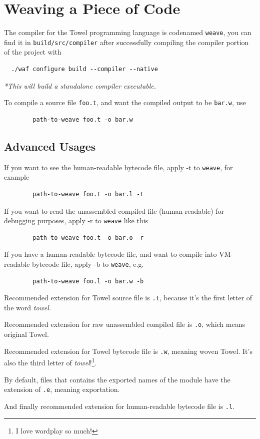 \documentclass{report}
\begin{document}
\section{Weaving a Piece of Code}

The compiler for the Towel programming language is codenamed \texttt{weave}, you can find it in \texttt{build/src/compiler} after successfully compiling the compiler portion of the project with
\begin{mdframed}[style=example]
\begin{verbatim}
  ./waf configure build --compiler --native
\end{verbatim}

\textit{*This will build a standalone compiler executable.}
\end{mdframed}

To compile a source file \texttt{foo.t}, and want the compiled output to be \texttt{bar.w}, use

\begin{verbatim}
        path-to-weave foo.t -o bar.w
\end{verbatim}

\subsection{Advanced Usages}

If you want to see the human-readable bytecode file, apply -t to \texttt{weave}, for example

\begin{verbatim}
        path-to-weave foo.t -o bar.l -t
\end{verbatim}

If you want to read the unassembled compiled file (human-readable) for debugging purposes, apply -r to \texttt{weave} like this

\begin{verbatim}
        path-to-weave foo.t -o bar.o -r
\end{verbatim}

If you have a human-readable bytecode file, and want to compile into VM-readable bytecode file, apply -b to \texttt{weave}, e.g.

\begin{verbatim}
        path-to-weave foo.l -o bar.w -b
\end{verbatim}

\begin{mdframed}[style=hint]
  Recommended extension for Towel source file is \texttt{.t}, because it's the first letter of the word \textit{towel}.

  Recommended extension for raw unassembled compiled file is \texttt{.o}, which means original Towel.

  Recommended extension for Towel bytecode file is \texttt{.w}, meaning woven Towel. It's also the third letter of \textit{towel}!\footnote{I love wordplay so much!}.

  By default, files that contains the exported names of the module have the extension of \texttt{.e}, meaning exportation.

  And finally recommended extension for human-readable bytecode file is \texttt{.l}.
\end{mdframed}
\end{document}
